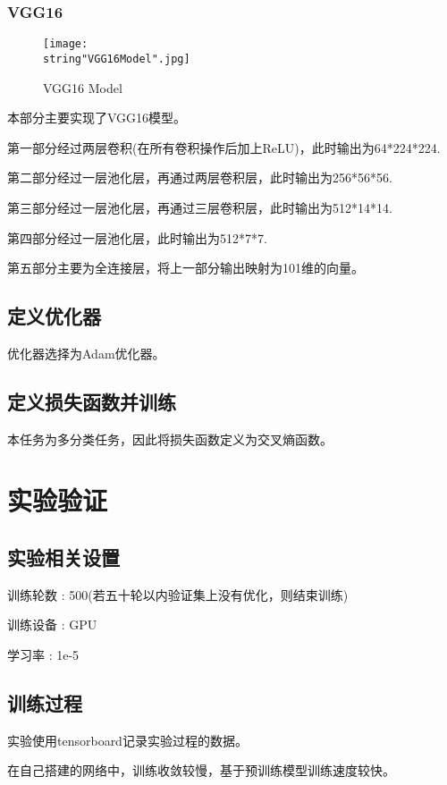 \documentclass[UTF8]{ctexart}
\begin{document}
\subsubsection{VGG16}
\begin{figure}[H]
    \begin{center}
        \texttt{[image: \\string"VGG16Model".jpg]}
    \caption{VGG16 Model}
    \label{fig:3}
    \end{center}
    \end{figure}
\par
本部分主要实现了VGG16模型。\par 
第一部分经过两层卷积(在所有卷积操作后加上ReLU)，此时输出为64*224*224.\par
第二部分经过一层池化层，再通过两层卷积层，此时输出为256*56*56.\par
第三部分经过一层池化层，再通过三层卷积层，此时输出为512*14*14.\par
第四部分经过一层池化层，此时输出为512*7*7.\par 
第五部分主要为全连接层，将上一部分输出映射为101维的向量。\par

\subsection{定义优化器}
优化器选择为Adam优化器。

\subsection{定义损失函数并训练}
本任务为多分类任务，因此将损失函数定义为交叉熵函数。

\section{实验验证}
\subsection{实验相关设置}
训练轮数 : 500(若五十轮以内验证集上没有优化，则结束训练)\par
训练设备 : GPU\par 
学习率 : 1e-5\par 
\subsection{训练过程}
实验使用tensorboard记录实验过程的数据。\par
在自己搭建的网络中，训练收敛较慢，基于预训练模型训练速度较快。 \par
\end{document}
